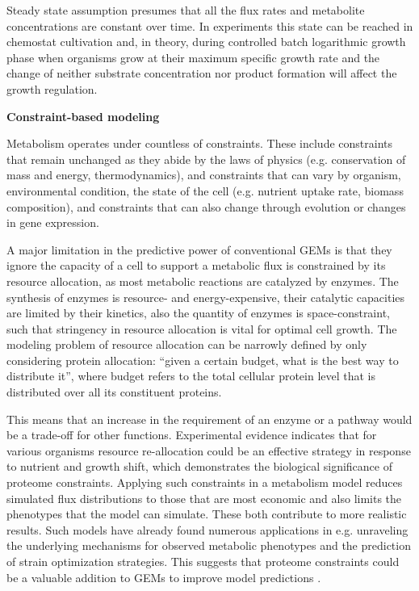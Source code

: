 Steady state assumption
presumes that all the flux rates and metabolite concentrations are constant over time. In experiments this state can be
reached in chemostat cultivation and, in theory, during controlled batch logarithmic growth
phase when organisms grow at their maximum specific growth rate and the change of neither substrate concentration 
nor product formation will affect the growth regulation. \cite{Kerkhoven2014} 


\textbf{Constraint-based modeling}

Metabolism operates under countless of constraints. These include constraints that 
remain unchanged as they abide by the laws of physics (e.g. conservation of mass and energy, thermodynamics), 
and constraints that can vary by organism, environmental condition, the state of the 
cell (e.g. nutrient uptake rate, biomass composition), and constraints that can also change through evolution or 
changes in gene expression. \cite{Kerkhoven2022}

A major limitation in the predictive power of conventional GEMs is that they ignore the capacity of a 
cell to support a metabolic flux is constrained by its resource allocation, as most metabolic reactions are 
catalyzed by enzymes. The synthesis of enzymes is resource- and energy-expensive, their catalytic 
capacities are limited by their kinetics, also the quantity of enzymes is space-constraint, such that 
stringency in resource allocation is vital for optimal cell growth. The modeling problem of resource allocation can 
be narrowly defined by only considering protein allocation: “given a certain budget, what is the best way to distribute 
it”, where budget refers to the total cellular protein level that is distributed over all its constituent proteins. \cite{Kerkhoven2022}

This means that an increase in the requirement of an enzyme or a pathway would be a trade-off for other
functions. Experimental evidence indicates that for various organisms resource re-allocation could be an effective strategy 
in response to nutrient and growth shift, which demonstrates the biological significance 
of proteome constraints. \cite{Chen2023} 
Applying such constraints in a metabolism model reduces simulated flux distributions to those that are most 
economic and also limits the phenotypes that the model can simulate. These both contribute to more realistic results. 
Such models have already found numerous applications in e.g. unraveling the underlying mechanisms for observed metabolic 
phenotypes and the prediction of strain optimization strategies. \cite{Kerkhoven2022}
This suggests that proteome constraints could be a valuable addition to GEMs to
improve model predictions \cite{Chen2023}. 

